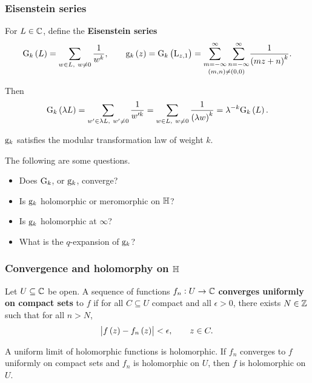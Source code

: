 \subsubsection{Eisenstein series}


\begin{definition}
For $ L \in \mathbb{C} $, define the \textbf{Eisenstein series}
$$ \G_k\br{L} = \sum_{w \in L, \ w \ne 0} \dfrac{1}{w^k}, \qquad \g_k\br{z} = \G_k\br{\L_{z, 1}} = \underset{\br{m, n} \ne \br{0, 0}}{\sum_{m = -\infty}^\infty \sum_{n = -\infty}^\infty} \dfrac{1}{\br{mz + n}^k}. $$
\end{definition}

Then
$$ \G_k\br{\lambda L} = \sum_{w' \in \lambda L, \ w' \ne 0} \dfrac{1}{w'^k} = \sum_{w \in L, \ w \ne 0} \dfrac{1}{\br{\lambda w}^k} = \lambda^{-k}\G_k\br{L}. $$

\begin{corollary}
$ \mathrm{g}_k $ satisfies the modular transformation law of weight $ k $.
\end{corollary}

The following are some questions.
\begin{itemize}
\item Does $ \mathrm{G}_k $, or $ \mathrm{g}_k $, converge?
\item Is $ \mathrm{g}_k $ holomorphic or meromorphic on $ \mathbb{H} $?
\item Is $ \mathrm{g}_k $ holomorphic at $ \infty $?
\item What is the $ q $-expansion of $ \mathrm{g}_k $?
\end{itemize}

\subsubsection{Convergence and holomorphy on \texorpdfstring{$ \mathbb{H} $}{H}}

\begin{definition}
Let $ U \subseteq \mathbb{C} $ be open. A sequence of functions $ f_n : U \to \mathbb{C} $ \textbf{converges uniformly on compact sets} to $ f $ if for all $ C \subseteq U $ compact and all $ \epsilon > 0 $, there exists $ N \in \mathbb{Z} $ such that for all $ n > N $,
$$ \abs{f\br{z} - f_n\br{z}} < \epsilon, \qquad z \in C. $$
\end{definition}

\begin{theorem}
A uniform limit of holomorphic functions is holomorphic. If $ f_n $ converges to $ f $ uniformly on compact sets and $ f_n $ is holomorphic on $ U $, then $ f $ is holomorphic on $ U $.
\end{theorem}

